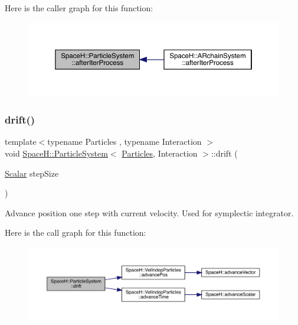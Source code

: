 Here is the caller graph for this function\+:
\nopagebreak
\begin{figure}[H]
\begin{center}
\leavevmode
\includegraphics[width=350pt]{class_space_h_1_1_particle_system_af31e35ad97bedb42ab85c107f1277004_icgraph}
\end{center}
\end{figure}
\mbox{\label{class_space_h_1_1_particle_system_a9a0a562d544beab2b7ac4c964d641cea}} 
\subsubsection{\texorpdfstring{drift()}{drift()}}
{\footnotesize\ttfamily template$<$typename Particles , typename Interaction $>$ \\
void \mbox{\hyperlink{class_space_h_1_1_particle_system}{Space\+H\+::\+Particle\+System}}$<$ \mbox{\hyperlink{struct_space_h_1_1_particles}{Particles}}, Interaction $>$\+::drift (\begin{DoxyParamCaption}\item[{\mbox{\hyperlink{class_space_h_1_1_particle_system_a522770dcfaf8b29aed35ea9348185a34}{Scalar}}}]{step\+Size }\end{DoxyParamCaption})\hspace{0.3cm}{\ttfamily [inline]}}



Advance position one step with current velocity. Used for symplectic integrator. 

Here is the call graph for this function\+:
\nopagebreak
\begin{figure}[H]
\begin{center}
\leavevmode
\includegraphics[width=350pt]{class_space_h_1_1_particle_system_a9a0a562d544beab2b7ac4c964d641cea_cgraph}
\end{center}
\end{figure}
\mbox{\label{class_space_h_1_1_particle_system_adf4cf89418a06d338dd464b775aa3446}} 
